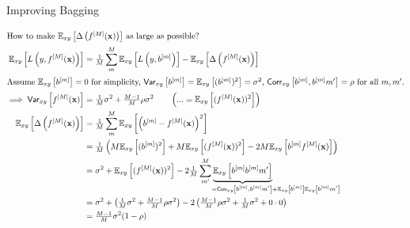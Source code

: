 \documentclass[11pt,compress,t,notes=noshow, xcolor=table]{beamer}
\begin{document}
\begin{vbframe}{Improving Bagging}
\begin{scriptsize}
\begin{align*}
\shortintertext{How to make $\Exy\left[\ambifM\right]$ as large as possible?}
\Exy\left[L\left(y, \fM \right)\right] &= \tfrac{1}{M}\sum^M_{m} \Exy\left[L\left(y, \bl \right)\right] - \Exy\left[\ambifM\right] \\
\shortintertext{Assume $\Exy\left[\bl\right] = 0$ for simplicity, $\var_{xy}\left[\bl\right] = \Exy\left[(\bl)^2\right] = \sigma^2$, $\corr_{xy}\left[\bl, \bl{m'}\right] = \rho$ for all $m, m'$.}
\implies 
\var_{xy}\left[\fM\right] &= \tfrac{1}{M} \sigma^2 +  \tfrac{M-1}{M} \rho \sigma^2 \qquad\left(... = \Exy\left[(\fM)^2\right]\right)\\
 \Exy\left[\ambifM\right] &= \tfrac{1}{M}\sum^M_{m} \Exy\left[\left(\bl- \fM\right)^2\right]\\
 & = \tfrac{1}{M}\left(M \Exy\left[(\bl)^2\right] + M \Exy\left[(\fM)^2\right] - 
     2 M \Exy\left[\bl\fM\right]\right) \\
  & = \sigma^2  + \Exy\left[(\fM)^2\right] - 2 \tfrac{1}{M}\sum^M_{m'} \underbrace{\Exy\left[\bl \bl{m'} \right]}_{\mathclap{\qquad\qquad\qquad\qquad= \cov_{xy}\left[\bl, \bl{m'} \right] + \Exy\left[\bl\right]\Exy\left[\bl{m'}\right]}} \\
  &=  \sigma^2  + \left(\tfrac{1}{M} \sigma^2 +   \tfrac{M-1}{M} \rho \sigma^2\right) - 2\left(\tfrac{M-1}{M} \rho\sigma^2 + \tfrac{1}{M}\sigma^2 + 0 \cdot 0 \right)\\
  &= \tfrac{M-1}{M} \sigma^2 (1-\rho)
\end{align*}
\end{scriptsize}


\end{vbframe}
\end{document}
